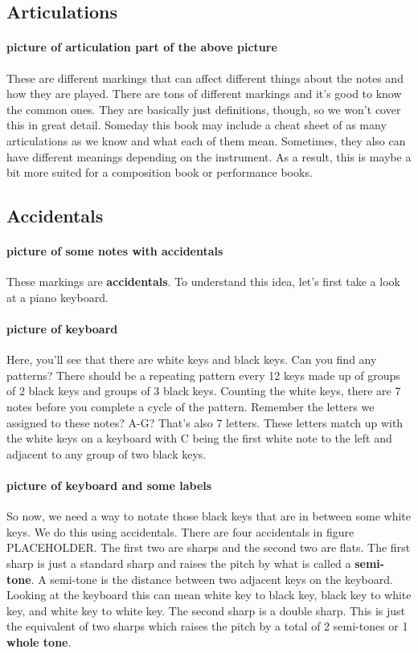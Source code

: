 \documentclass[../OpenAppliedMusicTheory.tex]{subfiles}
\begin{document}
        \subsection{Articulations}

        \paragraph{picture of articulation part of the above picture}
        These are different markings that can affect different things about the notes and how they are played. There are tons of different markings and it's good to know the common ones. They are basically just definitions, though, so we won't cover this in great detail. Someday this book may include a cheat sheet of as many articulations as we know and what each of them mean. %
        Sometimes, they also can have different meanings depending on the instrument. As a result, this is maybe a bit more suited for a composition book or performance books.

        \subsection{Accidentals}
        \paragraph{picture of some notes with accidentals}
        These markings are \textbf{accidentals}. To understand this idea, let's first take a look at a piano keyboard.

        \paragraph{picture of keyboard}
        Here, you'll see that there are white keys and black keys. Can you find any patterns? There should be a repeating pattern every 12 keys made up of groups of 2 black keys and groups of 3 black keys. Counting the white keys, there are 7 notes before you complete a cycle of the pattern. Remember the letters we assigned to these notes? A-G? That's also 7 letters. These letters match up with the white keys on a keyboard with C being the first white note to the left and adjacent to any group of two black keys. 

        \paragraph{picture of keyboard and some labels}
        So now, we need a way to notate those black keys that are in between some white keys. We do this using accidentals. There are four accidentals in figure %
        PLACEHOLDER. The first two are sharps and the second two are flats. The first sharp is just a standard sharp and raises the pitch by what is called a \textbf{semi-tone}. A semi-tone is the distance between two adjacent keys on the keyboard. Looking at the keyboard this can mean white key to black key, black key to white key, and white key to white key. The second sharp is a double sharp. This is just the equivalent of two sharps which raises the pitch by a total of 2 semi-tones or 1 \textbf{whole tone}.
\end{document}
